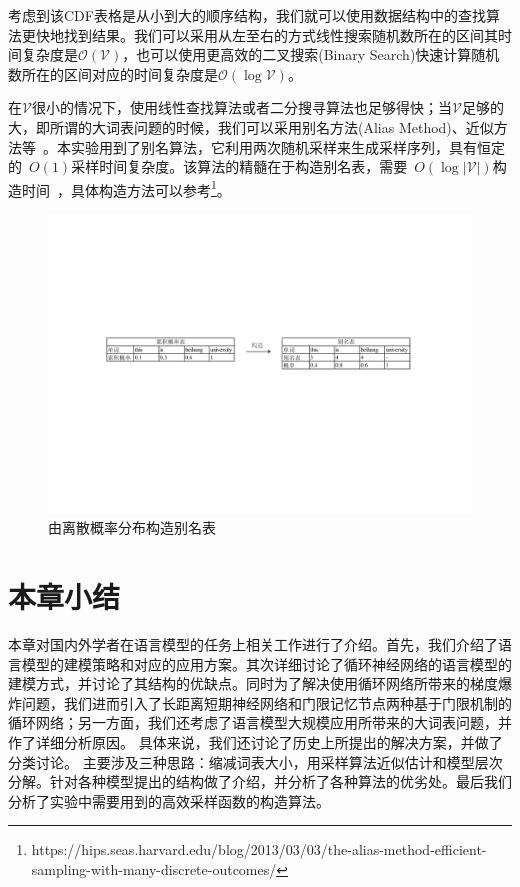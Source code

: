 考虑到该CDF表格是从小到大的顺序结构，我们就可以使用数据结构中的查找算法更快地找到结果。我们可以采用从左至右的方式线性搜索随机数所在的区间其时间复杂度是$\mathcal{O}(\mathcal{V})$，也可以使用更高效的二叉搜索(Binary Search)快速计算随机数所在的区间对应的时间复杂度是$\mathcal{O}(\log \mathcal{V})$。



在$\mathcal{V}$很小的情况下，使用线性查找算法或者二分搜寻算法也足够得快；当$\mathcal{V}$足够的大，即所谓的大词表问题的时候，我们可以采用别名方法(Alias Method)、近似方法等~。本实验用到了别名算法，它利用两次随机采样来生成采样序列，具有恒定的~$O(1)$采样时间复杂度。该算法的精髓在于构造别名表，需要~$O(\log |\mathcal{V}|)$构造时间~，具体构造方法可以参考\footnote{https://hips.seas.harvard.edu/blog/2013/03/03/the-alias-method-efficient-sampling-with-many-discrete-outcomes/}。

\begin{figure}[!t]
  \centering
\includegraphics[width=1\linewidth]{./figures/alias.pdf}
\caption{由离散概率分布构造别名表}\label{fig:alias}
\end{figure}

\section{本章小结}
本章对国内外学者在语言模型的任务上相关工作进行了介绍。首先，我们介绍了语言模型的建模策略和对应的应用方案。其次详细讨论了循环神经网络的语言模型的建模方式，并讨论了其结构的优缺点。同时为了解决使用循环网络所带来的梯度爆炸问题，我们进而引入了长距离短期神经网络和门限记忆节点两种基于门限机制的循环网络；另一方面，我们还考虑了语言模型大规模应用所带来的大词表问题，并作了详细分析原因。
具体来说，我们还讨论了历史上所提出的解决方案，并做了分类讨论。
主要涉及三种思路：缩减词表大小，用采样算法近似估计和模型层次分解。针对各种模型提出的结构做了介绍，并分析了各种算法的优劣处。最后我们分析了实验中需要用到的高效采样函数的构造算法。